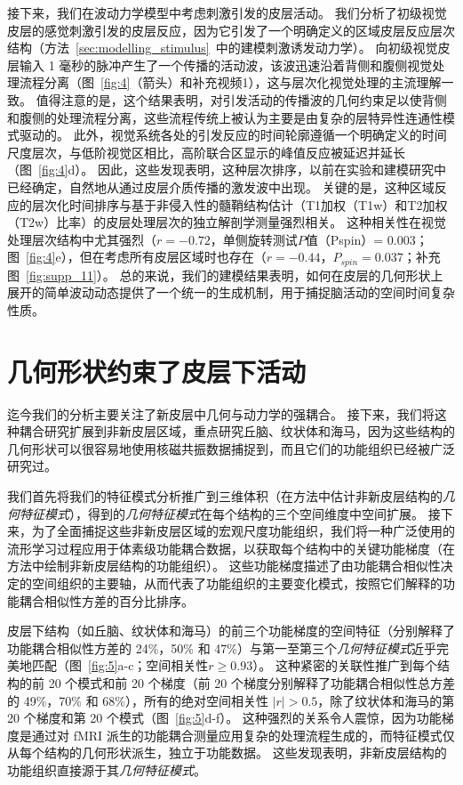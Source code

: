 \documentclass[lang=cn,a4paper,newtx,citestyle=gb7714-2015, bibstyle=gb7714-2015]{elegantpaper}
\begin{document}
接下来，我们在波动力学模型中考虑刺激引发的皮层活动。
我们分析了初级视觉皮层的感觉刺激引发的皮层反应，因为它引发了一个明确定义的区域皮层反应层次结构（方法~\ref{sec:modelling_stimulus}~中的建模刺激诱发动力学）。
向初级视觉皮层输入 1 毫秒的脉冲产生了一个传播的活动波，该波迅速沿着背侧和腹侧视觉处理流程分离（图~\ref{fig:4}（箭头）和补充视频1），这与层次化视觉处理的主流理解一致。
值得注意的是，这个结果表明，对引发活动的传播波的几何约束足以使背侧和腹侧的处理流程分离，这些流程传统上被认为主要是由复杂的层特异性连通性模式驱动的。
此外，视觉系统各处的引发反应的时间轮廓遵循一个明确定义的时间尺度层次，与低阶视觉区相比，高阶联合区显示的峰值反应被延迟并延长（图~\ref{fig:4}d）。
因此，这些发现表明，这种层次排序，以前在实验和建模研究中已经确定，自然地从通过皮层介质传播的激发波中出现。
关键的是，这种区域反应的层次化时间排序与基于非侵入性的髓鞘结构估计（T1加权（T1w）和T2加权（T2w）比率）的皮层处理层次的独立解剖学测量强烈相关。
这种相关性在视觉处理层次结构中尤其强烈（$ r = -0.72 $，单侧旋转测试$ P $值（Pspin）= 0.003；图~\ref{fig:4}e），但在考虑所有皮层区域时也存在（$ r = -0.44 $，$ P_{spin} = 0.037 $；补充图~\ref{fig:supp_11}）。
总的来说，我们的建模结果表明，如何在皮层的几何形状上展开的简单波动动态提供了一个统一的生成机制，用于捕捉脑活动的空间时间复杂性质。



\section{几何形状约束了皮层下活动}

迄今我们的分析主要关注了新皮层中几何与动力学的强耦合。
接下来，我们将这种耦合研究扩展到非新皮层区域，重点研究丘脑、纹状体和海马，因为这些结构的几何形状可以很容易地使用核磁共振数据捕捉到，而且它们的功能组织已经被广泛研究过。


我们首先将我们的特征模式分析推广到三维体积（在方法中估计非新皮层结构的\textit{几何特征模式}），得到的\textit{几何特征模式}在每个结构的三个空间维度中空间扩展。
接下来，为了全面捕捉这些非新皮层区域的宏观尺度功能组织，我们将一种广泛使用的流形学习过程应用于体素级功能耦合数据，以获取每个结构中的关键功能梯度（在方法中绘制非新皮层结构的功能组织）。
这些功能梯度描述了由功能耦合相似性决定的空间组织的主要轴，从而代表了功能组织的主要变化模式，按照它们解释的功能耦合相似性方差的百分比排序。


皮层下结构（如丘脑、纹状体和海马）的前三个功能梯度的空间特征（分别解释了功能耦合相似性方差的 24\%，50\% 和 47\%）与第一至第三个\textit{几何特征模式}近乎完美地匹配（图~\ref{fig:5}a-c；空间相关性$ r\geq0.93 $）。
这种紧密的关联性推广到每个结构的前 20 个模式和前 20 个梯度（前 20 个梯度分别解释了功能耦合相似性总方差的 49\%，70\% 和 68\%），所有的绝对空间相关性 $ |r| > 0.5 $，除了纹状体和海马的第 20 个梯度和第 20 个模式（图~\ref{fig:5}d-f）。
这种强烈的关系令人震惊，因为功能梯度是通过对 fMRI 派生的功能耦合测量应用复杂的处理流程生成的，而特征模式仅从每个结构的几何形状派生，独立于功能数据。
这些发现表明，非新皮层结构的功能组织直接源于其\textit{几何特征模式}。
\end{document}
